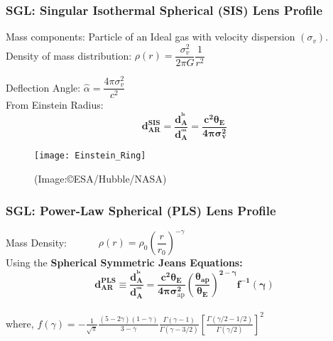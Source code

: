 \documentclass[10pt,xcolor={dvipsnames}]{beamer}
\begin{document}
\begin{frame}
 \frametitle{\textbf{SGL}: {\large Singular Isothermal Spherical (SIS) Lens {\normalsize Profile}}}
  Mass components: {\small Particle of an Ideal gas with velocity dispersion $(\sigma_v)$}.
 \vspace{3mm}\\

 Density of mass distribution: $\rho(r)=\dfrac{\sigma_{v}^{2}}{2 \pi G} \dfrac{1}{r^{2}}$
\vspace{3mm}\\

 \begin{minipage}{0.60\textwidth}



 Deflection Angle: $\hat{\alpha}=\dfrac{4 \pi \sigma_{v}^{2}}{c^{2}}$
\vspace{4mm}\\

 From Einstein Radius: 
$$
{\boxed{\boldsymbol{d_{AR}^{SIS}=\dfrac{d_A^{^{ls}}}{d_A^{^{os}}}=\dfrac{c^2\theta_E}{4\pi \sigma_{{v}}^2}}}}
$$
\end{minipage}%
\hfill
\begin{minipage}{0.40\textwidth}
\begin{figure}[ht!]
\centering
\texttt{[image: Einstein\_Ring]} \\
\begin{scriptsize}
{(Image:\copyright ESA/Hubble/NASA)}

\end{scriptsize}
\end{figure} 

\end{minipage}%
\end{frame}
\begin{frame}
 \frametitle{\textbf{SGL}: { {\large Power-Law Spherical (PLS) Lens Profile}}}
 Mass Density:  $~~~~~~~~~~~~~\rho(r)=\rho_{0}\left(\dfrac{r}{r_{0}}\right)^{-\gamma}$ 
\vspace{3mm}\\
Using the \textbf{Spherical Symmetric Jeans Equations:} 
$$
{\boxed{\boldsymbol{d_{AR}^{PLS} \equiv \dfrac{d_{A}^{^{l s}}}{d_{A}^{^{os}}}=\dfrac{c^{2} \theta_{E}}{4 \pi \sigma_{\mathrm{ap}}^{2}}\left(\dfrac{\theta_{a p}}{\theta_{E}}\right)^{2-\gamma} f^{-1}(\gamma)}}}
$$
\vspace{3mm}\\
 where,
 $f(\gamma)=-\frac{1}{\sqrt{\pi}} \frac{(5-2 \gamma)(1-\gamma)}{3-\gamma} \frac{\Gamma(\gamma-1)}{\Gamma(\gamma-3 / 2)}\left[\frac{\Gamma(\gamma / 2-1 / 2)}{\Gamma(\gamma / 2)}\right]^{2}$\\
\end{frame}
\end{document}
